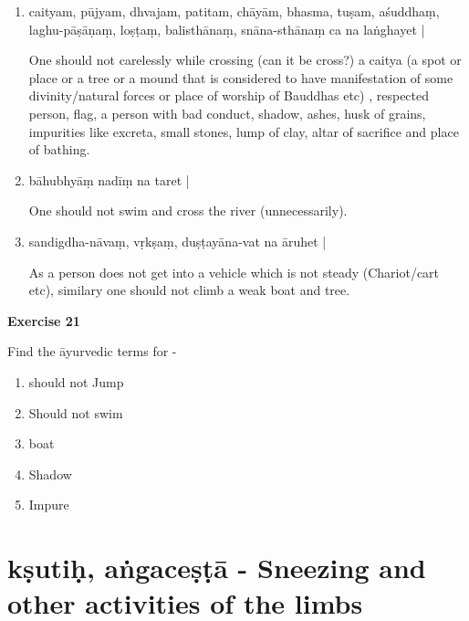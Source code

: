 \begin{enumerate}
\item {}

caityam, pūjyam, dhvajam, patitam, chāyām, bhasma, tuṣam, aśuddhaṃ, laghu-pāṣāṇaṃ, loṣṭaṃ, balisthānaṃ, snāna-sthānaṃ ca  na laṅghayet | 

One should not carelessly while crossing (can it be cross?) a caitya (a spot or place or a tree or a mound that is considered to have manifestation of some divinity/natural forces or place of worship of Bauddhas etc) , respected person, flag, a person with bad conduct, shadow, ashes, husk of grains, impurities like excreta, small stones, lump of clay, altar of sacrifice and place of bathing. 

\item {}

bāhubhyāṃ nadīṃ na taret | 

One should not swim and cross the river (unnecessarily). 

\item {}

sandigdha-nāvaṃ, vṛkṣaṃ, duṣṭayāna-vat na āruhet |    

As a person does not get into a vehicle which is not steady (Chariot/cart etc), similary one should not climb a weak boat and tree.
\end{enumerate}

\begin{center}
\textbf{\large Exercise 21}
\end{center}

Find the āyurvedic terms for -
\begin{enumerate}
\renewcommand{\theenumi}{\alph{enumi}}
\renewcommand{\labelenumi}{\theenumi.}
\item should not Jump
\item Should not swim 
\item boat 
\item Shadow 
\item Impure
\end{enumerate}

\chapter{kṣutiḥ, aṅgaceṣṭā - Sneezing and other activities of the limbs}

